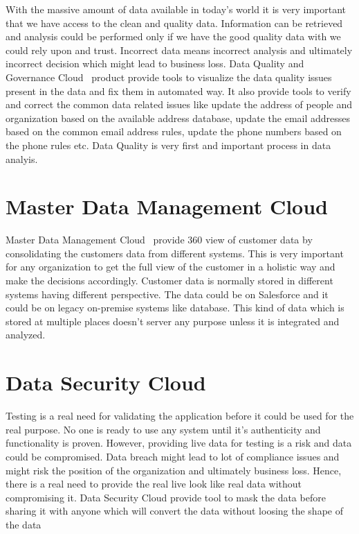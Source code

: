 With the massive amount of data available in today's world it is very
important that we have access to the clean and quality
data. Information can be retrieved and analysis could be performed
only if we have the good quality data with we could rely upon and
trust. Incorrect data means incorrect analysis and ultimately
incorrect decision which might lead to business loss. Data Quality and
Governance Cloud~\cite{hid-sp18-511-iics} product provide tools to
visualize the data quality issues present in the data and fix them in
automated way. It also provide tools to verify and correct the common
data related issues like update the address of people and organization
based on the available address database, update the email addresses
based on the common email address rules, update the phone numbers
based on the phone rules etc. Data Quality is very first and important
process in data analyis.

\section{Master Data Management Cloud}

Master Data Management Cloud~\cite{hid-sp18-511-iics} provide 360 view
of customer data by consolidating the customers data from different
systems. This is very important for any organization to get the full
view of the customer in a holistic way and make the decisions
accordingly. Customer data is normally stored in different systems
having different perspective. The data could be on
Salesforce\cite{hid-sp18-511-salesforce} and it could be on legacy
on-premise systems like database. This kind of data which is stored at
multiple places doesn't server any purpose unless it is integrated and
analyzed.

\section{Data Security Cloud}

Testing is a real need for validating the application before it could
be used for the real purpose. No one is ready to use any system until
it's authenticity and functionality is proven. However, providing live
data for testing is a risk and data could be compromised. Data breach
might lead to lot of compliance issues and might risk the position of
the organization and ultimately business loss. Hence, there is a real
need to provide the real live look like real data without compromising
it. Data Security Cloud\cite{hid-sp18-511-iics} provide tool to mask
the data before sharing it with anyone which will convert the data
without loosing the shape of the data

